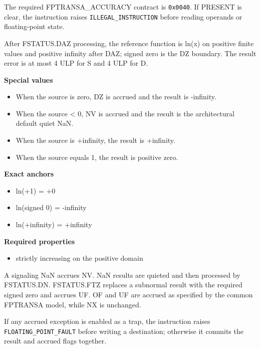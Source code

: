 The required FPTRANSA\_ACCURACY contract is \texttt{0x0040}. If PRESENT is clear, the instruction raises \texttt{ILLEGAL\_INSTRUCTION} before reading operands or floating-point state.

After FSTATUS.DAZ processing, the reference function is ln(x) on positive finite values and positive infinity after DAZ; signed zero is the DZ boundary. The result error is at most 4 ULP for S and 4 ULP for D.

\textbf{Special values}\par
\begin{itemize}
\item When the source is zero, DZ is accrued and the result is -infinity.
\item When the source \textless{} 0, NV is accrued and the result is the architectural default quiet NaN.
\item When the source is +infinity, the result is +infinity.
\item When the source equals 1, the result is positive zero.
\end{itemize}

\textbf{Exact anchors}\par
\begin{itemize}
\item ln(+1) = +0
\item ln(signed 0) = -infinity
\item ln(+infinity) = +infinity
\end{itemize}

\textbf{Required properties}\par
\begin{itemize}
\item strictly increasing on the positive domain
\end{itemize}

A signaling NaN accrues NV. NaN results are quieted and then processed by FSTATUS.DN. FSTATUS.FTZ replaces a subnormal result with the required signed zero and accrues UF. OF and UF are accrued as specified by the common FPTRANSA model, while NX is unchanged.

If any accrued exception is enabled as a trap, the instruction raises \texttt{FLOATING\_POINT\_FAULT} before writing a destination; otherwise it commits the result and accrued flags together.
